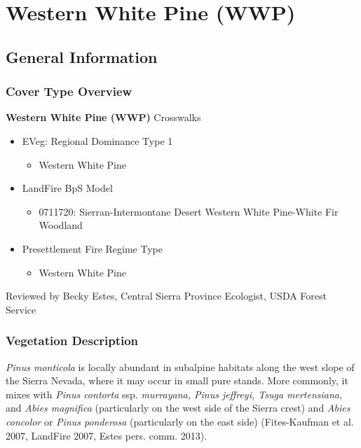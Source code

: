 \newpage
\section{Western White Pine (WWP)}
\label{wwp-description}
\subsection*{General Information}

\subsubsection{Cover Type Overview}

\textbf{Western White Pine (WWP)}
\newline
Crosswalks
\begin{itemize}
	\item EVeg: Regional Dominance Type 1
	\begin{itemize}
		\item Western White Pine 
	\end{itemize}

	\item LandFire BpS Model
	\begin{itemize}
		\item 0711720: Sierran-Intermontane Desert Western White Pine-White Fir Woodland
	\end{itemize}

	\item Presettlement Fire Regime Type
	\begin{itemize}
		\item Western White Pine
	\end{itemize}
\end{itemize}

\noindent Reviewed by Becky Estes, Central Sierra Province Ecologist, USDA Forest Service

\subsubsection{Vegetation Description}
\emph{Pinus monticola} is locally abundant in subalpine habitats along the west slope of the Sierra Nevada, where it may occur in small pure stands. More commonly, it mixes with \emph{Pinus contorta} ssp. \emph{murrayana, Pinus jeffreyi, Tsuga mertensiana}, and \emph{Abies magnifica} (particularly on the west side of the Sierra crest) and \emph{Abies concolor} or \emph{Pinus ponderosa} (particularly on the east side) (Fites-Kaufman et al. 2007, LandFire 2007, Estes pers. comm. 2013).

